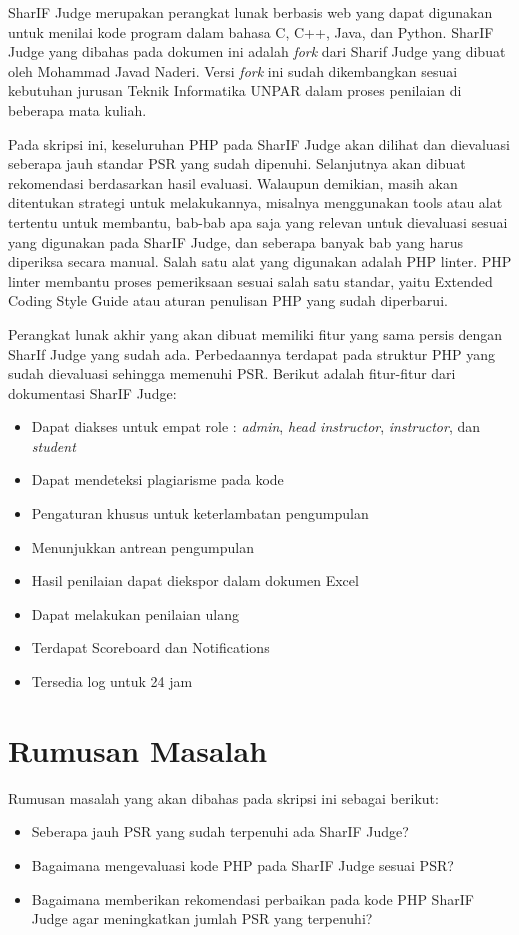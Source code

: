 SharIF Judge merupakan perangkat lunak berbasis web yang dapat digunakan untuk menilai kode program dalam bahasa C, C++, Java, dan Python. SharIF Judge \cite{SharIF_Judge} yang dibahas pada dokumen ini adalah \textit{fork} dari Sharif Judge \cite{Sharif_Judge_Original} yang dibuat oleh Mohammad Javad Naderi. Versi \textit{fork} ini sudah dikembangkan sesuai kebutuhan jurusan Teknik Informatika UNPAR dalam proses penilaian di beberapa mata kuliah.

Pada skripsi ini, keseluruhan PHP pada SharIF Judge akan dilihat dan dievaluasi seberapa jauh standar PSR yang sudah dipenuhi. Selanjutnya akan dibuat rekomendasi berdasarkan hasil evaluasi. Walaupun demikian, masih akan ditentukan strategi untuk melakukannya, misalnya menggunakan tools atau alat tertentu untuk membantu, bab-bab apa saja yang relevan untuk dievaluasi sesuai yang digunakan pada SharIF Judge, dan seberapa banyak bab yang harus diperiksa secara manual. Salah satu alat yang digunakan adalah PHP linter. PHP linter membantu proses pemeriksaan sesuai salah satu standar, yaitu Extended Coding Style Guide atau aturan penulisan PHP yang sudah diperbarui. 

Perangkat lunak akhir yang akan dibuat memiliki fitur yang sama persis dengan SharIf Judge yang sudah ada. Perbedaannya terdapat pada struktur PHP yang sudah dievaluasi sehingga memenuhi PSR. Berikut adalah fitur-fitur dari dokumentasi SharIF Judge:
\begin{itemize}
	\item Dapat diakses untuk empat role : \textit{admin}, \textit{head instructor}, \textit{instructor}, dan \textit{student}
	\item Dapat mendeteksi plagiarisme pada kode
	\item Pengaturan khusus untuk keterlambatan pengumpulan
	\item Menunjukkan antrean pengumpulan
	\item Hasil penilaian dapat diekspor dalam dokumen Excel
	\item Dapat melakukan penilaian ulang
	\item Terdapat Scoreboard dan Notifications
	\item Tersedia log untuk 24 jam 
\end{itemize}


\section{Rumusan Masalah}
\label{sec:rumusan}
Rumusan masalah yang akan dibahas pada skripsi ini sebagai berikut:
\begin{itemize}
	\item Seberapa jauh PSR yang sudah terpenuhi ada SharIF Judge?
	\item Bagaimana mengevaluasi kode PHP pada SharIF Judge sesuai PSR?  
	\item Bagaimana memberikan rekomendasi perbaikan pada kode PHP SharIF Judge agar meningkatkan jumlah PSR yang terpenuhi?
\end{itemize}

